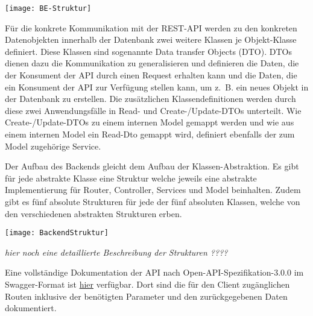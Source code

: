 \vspace{20pt}
\begin{center}
    \begin{minipage}{1\linewidth}
        \texttt{[image: BE-Struktur]}
    \end{minipage}
\end{center}
\vspace{20pt}

Für die konkrete Kommunikation mit der REST-API werden zu den konkreten Datenobjekten innerhalb der Datenbank zwei weitere Klassen je Objekt-Klasse definiert. Diese Klassen sind sogenannte Data transfer Objects (DTO). DTOs dienen dazu die Kommunikation zu generalisieren und definieren die Daten, die der Konsument der API durch einen Request erhalten kann und die Daten, die ein Konsument der API zur Verfügung stellen kann, um z. B. ein neues Objekt in der Datenbank zu erstellen. Die zusätzlichen Klassendefinitionen werden durch diese zwei Anwendungsfälle in Read- und Create-/Update-DTOs unterteilt. Wie Create-/Update-DTOs zu einem internen Model gemappt werden und wie aus einem internen Model ein Read-Dto gemappt wird, definiert ebenfalls der zum Model zugehörige Service.

Der Aufbau des Backends gleicht dem Aufbau der Klassen-Abstraktion. Es gibt für jede abstrakte Klasse eine Struktur welche jeweils eine abstrakte Implementierung für Router, Controller, Services und Model beinhalten.
Zudem gibt es fünf absolute Strukturen für jede der fünf absoluten Klassen, welche von den verschiedenen abstrakten Strukturen erben.

\vspace{20pt}
\begin{center}
    \begin{minipage}{0.7\linewidth}
        \texttt{[image: BackendStruktur]}
    \end{minipage}
\end{center}
\vspace{20pt}

\emph{hier noch eine detaillierte Beschreibung der Strukturen ????}

Eine vollständige Dokumentation der API nach Open-API-Spezifikation-3.0.0 im Swagger-Format ist \href{https://116.203.140.167.nip.io/api-docs/}{hier} verfügbar. Dort sind die für den Client zugänglichen Routen inklusive der benötigten Parameter und den zurückgegebenen Daten dokumentiert.

